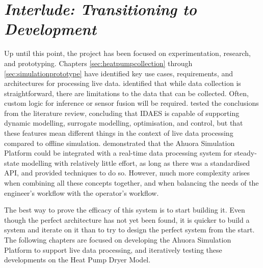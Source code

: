 \chapter*{\textit{Interlude: Transitioning to Development}} \label{sec:interlude}


Up until this point, the project has been focused on experimentation, research, and prototyping. Chapters \ref{sec:heatpumpcollection} through \ref{sec:simulationprototype} have identified key use cases, requirements, and architectures for processing live data. 
 identified that while data collection is straightforward, there are limitations to the data that can be collected. Often, custom logic for inference or sensor fusion will be required.  tested the conclusions from the literature review, concluding that IDAES is capable of supporting dynamic modelling, surrogate modelling, optimisation, and control, but that these features mean different things in the context of live data processing compared to offline simulation.  demonstrated that the Ahuora Simulation Platform could be integrated with a real-time data processing system for steady-state modelling with relatively little effort, as long as there was a standardised API, and provided techniques to do so. However, much more complexity arises when combining all these concepts together, and when balancing the needs of the engineer's workflow with the operator's workflow.

The best way to prove the efficacy of this system is to start building it. Even though the perfect architecture has not yet been found, it is quicker to build a system and iterate on it than to try to design the perfect system from the start. The following chapters are focused on developing the Ahuora Simulation Platform to support live data processing, and iteratively testing these developments on the Heat Pump Dryer Model.

